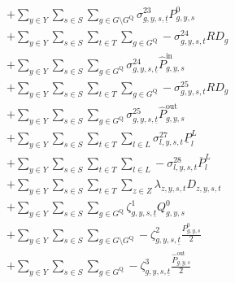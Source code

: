\documentclass{article}
\newcommand{\sGenerators}{G}
\newcommand{\sStorage}{G^{\mathrm{Q}}}
\newcommand{\sYears}{Y}
\newcommand{\sScenarios}{S}
\newcommand{\sIntervals}{T}
\newcommand{\sZones}{Z}
\newcommand{\sLinks}{L}
\newcommand{\iGenerator}{g}
\newcommand{\iYear}{y}
\newcommand{\iScenario}{s}
\newcommand{\iInterval}{t}
\newcommand{\iIntervalStart}{\underline{\iInterval}}
\newcommand{\iZone}{z}
\newcommand{\iLink}{l}
\newcommand{\cRampRateDown}[1][\iGenerator]{RD_{#1}}
\newcommand{\cDemand}[1][\iZone,\iYear,\iScenario,\iInterval]{D_{#1}}
\newcommand{\cPowerFlowMin}{\underline{P}_{\iLink}^{L}}
\newcommand{\cPowerFlowMax}{\overline{P}_{\iLink}^{L}}
\newcommand{\cPowerInitial}[1][\iGenerator,\iYear,\iScenario]{P_{#1}^{0}}
\newcommand{\cPowerOutInitial}[1][\iGenerator,\iYear,\iScenario]{\hat{P}_{#1}^{\mathrm{out}}}
\newcommand{\cStorageEnergyInitial}[1][\iGenerator,\iYear,\iScenario]{Q_{#1}^{0}}
\newcommand{\cPowerInInitial}[1][\iGenerator,\iYear,\iScenario]{\hat{P}_{#1}^{\mathrm{in}}}
\newcommand{\dRampRateDown}[1][\iGenerator,\iYear,\iScenario,\iInterval]{\sigma_{#1}^{23}}
\newcommand{\dRampRateDownStorageCharging}[1][\iGenerator,\iYear,\iScenario,\iInterval]{\sigma_{#1}^{24}}
\newcommand{\dRampRateDownStorageDischarging}[1][\iGenerator,\iYear,\iScenario,\iInterval]{\sigma_{#1}^{25}}
\newcommand{\dMinPowerFlow}[1][\iLink,\iYear,\iScenario,\iInterval]{\sigma_{#1}^{27}}
\newcommand{\dMaxPowerFlow}[1][\iLink,\iYear,\iScenario,\iInterval]{\sigma_{#1}^{28}}
\newcommand{\dPowerBalance}[1][\iZone,\iYear,\iScenario,\iInterval]{\lambda_{#1}}
\newcommand{\dStorageEnergyTransition}[1][\iGenerator,\iYear,\iScenario,\iInterval]{\zeta_{#1}^{1}}
\newcommand{\dGeneratorEnergyOutput}[1][\iGenerator,\iYear,\iScenario,\iInterval]{\zeta_{#1}^{2}}
\newcommand{\dStorageEnergyOutput}[1][\iGenerator,\iYear,\iScenario,\iInterval]{\zeta_{#1}^{3}}
\begin{document}
\begin{align}
& + \sum\limits_{\iYear \in \sYears}\sum\limits_{\iScenario \in \sScenarios} \sum\limits_{\iGenerator \in \sGenerators \setminus \sStorage} \dRampRateDown[\iGenerator,\iYear,\iScenario,\iIntervalStart] \cPowerInitial\\
%
& + \sum\limits_{\iYear \in \sYears}\sum\limits_{\iScenario \in \sScenarios} \sum\limits_{\iInterval \in \sIntervals} \sum\limits_{\iGenerator \in \sStorage} - \dRampRateDownStorageCharging \cRampRateDown\\
& + \sum\limits_{\iYear \in \sYears}\sum\limits_{\iScenario \in \sScenarios} \sum\limits_{\iGenerator \in \sStorage} \dRampRateDownStorageCharging[\iGenerator,\iYear,\iScenario,\iIntervalStart] \cPowerInInitial\\
%
& + \sum\limits_{\iYear \in \sYears}\sum\limits_{\iScenario \in \sScenarios} \sum\limits_{\iInterval \in \sIntervals} \sum\limits_{\iGenerator \in \sStorage} - \dRampRateDownStorageDischarging \cRampRateDown\\
& + \sum\limits_{\iYear \in \sYears}\sum\limits_{\iScenario \in \sScenarios} \sum\limits_{\iGenerator \in \sStorage} \dRampRateDownStorageDischarging[\iGenerator,\iYear,\iScenario,\iIntervalStart] \cPowerOutInitial \\
%
& + \sum\limits_{\iYear \in \sYears}\sum\limits_{\iScenario \in \sScenarios}\sum\limits_{\iInterval \in \sIntervals} \sum\limits_{\iLink \in \sLinks} \dMinPowerFlow \cPowerFlowMin\\
& + \sum\limits_{\iYear \in \sYears}\sum\limits_{\iScenario \in \sScenarios}\sum\limits_{\iInterval \in \sIntervals} \sum\limits_{\iLink \in \sLinks} - \dMaxPowerFlow \cPowerFlowMax\\
& + \sum\limits_{\iYear \in \sYears}\sum\limits_{\iScenario \in \sScenarios}\sum\limits_{\iInterval \in \sIntervals} \sum\limits_{\iZone \in \sZones} \dPowerBalance \cDemand\\
& + \sum\limits_{\iYear \in \sYears}\sum\limits_{\iScenario \in \sScenarios}\sum\limits_{\iGenerator \in \sStorage} \dStorageEnergyTransition[\iGenerator,\iYear,\iScenario,\iIntervalStart] \cStorageEnergyInitial\\
& + \sum\limits_{\iYear \in \sYears}\sum\limits_{\iScenario \in \sScenarios}\sum\limits_{\iGenerator \in \sGenerators \setminus \sStorage} - \dGeneratorEnergyOutput[\iGenerator, \iYear,\iScenario,\iIntervalStart] \frac{\cPowerInitial}{2}\\
& + \sum\limits_{\iYear \in \sYears}\sum\limits_{\iScenario \in \sScenarios}\sum\limits_{\iGenerator \in \sStorage} - \dStorageEnergyOutput[\iGenerator, \iYear,\iScenario,\iIntervalStart] \frac{\cPowerOutInitial}{2}\\

\end{align}
\end{document}
